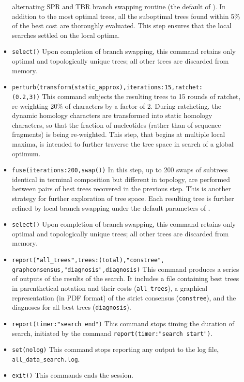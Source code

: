 \begin{itemize}
alternating SPR and TBR branch swapping routine (the default of \poy). In addition to the most optimal trees, 
all the suboptimal trees found within 5\% of the best cost are thoroughly evaluated. This step ensures that 
the local searches settled on the local optima.
\item \texttt{select()} Upon completion of branch swapping, this command retains only optimal and 
topologically unique trees; all other trees are discarded from memory. 
\item \texttt{perturb(transform(static\_approx),iterations:15,ratchet:\\(0.2,3))} This command subjects the 
resulting trees to 15 rounds of ratchet, re-weighting 20\% of characters by a factor of 2. During ratcheting, 
the dynamic homology characters are transformed into static homology characters, so that the fraction of 
nucleotides (rather than of sequence fragments) is being re-weighted. This step, that begins at multiple 
local maxima, is intended to further traverse the tree space in search of a global optimum.
\item \texttt{fuse(iterations:200,swap())} In this step, up to 200 swaps of subtrees identical in terminal 
composition but different in topology, are performed between pairs of best trees recovered in the previous 
step. This is another strategy for further exploration of tree space. Each resulting tree is further refined by 
local branch swapping under the default parameters of .
\item \texttt{select()} Upon completion of branch swapping, this command retains only optimal and 
topologically unique trees; all other trees are discarded from memory.
\item \texttt{report("all\_trees",trees:(total),"constree",\\graphconsensus,"diagnosis",diagnosis)} This command 
produces a series of outputs of the results of the search. It includes a file containing best trees in parenthetical 
notation and their costs (\texttt{all\_trees}), a graphical representation (in PDF format) of the strict consensus 
(\texttt{constree}), and the diagnoses for all best trees (\texttt{diagnosis}).
\item \texttt{report(timer:"search end")} This command stops timing the duration of search, initiated by the 
command \texttt{report(timer:"search start")}.
\item \texttt{set(nolog)} This command stops reporting any output to the log file, \texttt{all\_data\_search.log}.
\item \texttt{exit()} This commands ends the \poy session.
\end{itemize}

